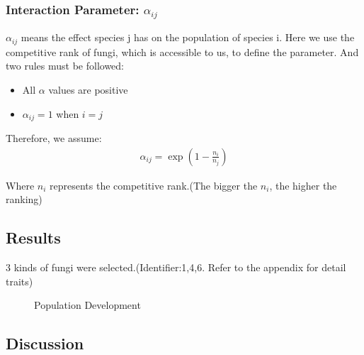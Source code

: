 \subsubsection{Interaction Parameter: $\alpha_{ij}$}

	$\alpha_{ij}$ means the effect species j has on the population of species i. Here we use the competitive rank of fungi, which is accessible to us, to define the parameter. And two rules must be followed:
	\begin{itemize}
		\item All $\alpha$ values are positive
		\item $\alpha_{ij}=1$ when $i=j$
	\end{itemize}

	Therefore, we assume:
	\begin{align}
		\alpha_{ij}=\exp(1-\frac{n_i}{n_j})	
	\end{align}

	Where $n_i$ represents the competitive rank.(The bigger the $n_i$, the higher the ranking)


\subsection{Results}
3 kinds of fungi were selected.(Identifier:1,4,6. Refer to the appendix for detail traits) 

\iffalse
	6 kinds of fungi were selected. Refer to the appendix for details. 
	The computation was under such conditions:
 
	\begin{align}
    	T=22^{\circ}\text C,\ M=-0.5\text{MPa}\nonumber   
	\end{align}

	and the population evolution with time is shown in Figure \ref{fig:result1}

	\begin{figure}[H]
    	\centering
	    \texttt{[image: 25\_05.png]}
    	\caption{The result of Model 1}\label{fig:result1}
    \end{figure}
 \fi
\begin{figure}[htbp]
\centering
{}
\quad
{}
\quad
{}
\quad
{}
\caption{Population Development}
\end{figure}



  
\subsection{Discussion}




















